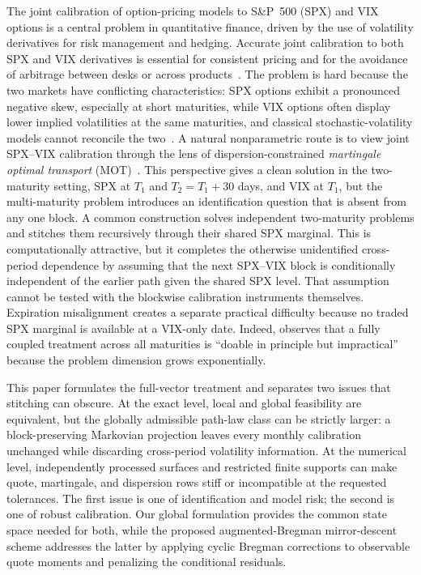 \documentclass{article}
\begin{document}
The joint calibration of option-pricing models to S\&P~500 (SPX) and VIX options is a central problem in quantitative finance, driven by the use of volatility derivatives for risk management and hedging.
Accurate joint calibration to both SPX and VIX derivatives is essential for consistent pricing and for the avoidance of arbitrage between desks or across products~\citep{guyon2020joint,cuchiero2025joint}.
The problem is hard because the two markets have conflicting characteristics:
SPX options exhibit a pronounced negative skew, especially at short maturities, while VIX options often display lower implied volatilities at the same maturities, and classical stochastic-volatility models cannot reconcile the two~\citep{carr2006tale,jacquier2018vix}.
A natural nonparametric route is to view joint SPX--VIX calibration through the lens of dispersion-constrained \emph{martingale optimal transport} (MOT)~\citep{Beiglbck2013,guyon2020joint}.
This perspective gives a clean solution in the two-maturity setting, SPX at $T_1$ and $T_2=T_1+30$ days, and VIX at $T_1$, but the multi-maturity problem introduces an identification question that is absent from any one block.
A common construction solves independent two-maturity problems and stitches them recursively through their shared SPX marginal.
This is computationally attractive, but it completes the otherwise unidentified cross-period dependence by assuming that the next SPX--VIX block is conditionally independent of the earlier path given the shared SPX level.
That assumption cannot be tested with the blockwise calibration instruments themselves.
Expiration misalignment creates a separate practical difficulty because no traded SPX marginal is available at a VIX-only date.
Indeed, \citet[Section~8]{guyon2020joint} observes that a fully coupled treatment across all maturities is ``doable in principle but impractical'' because the problem dimension grows exponentially.

This paper formulates the full-vector treatment and separates two issues that stitching can obscure.
At the exact level, local and global feasibility are equivalent, but the globally admissible path-law class can be strictly larger: a block-preserving Markovian projection leaves every monthly calibration unchanged while discarding cross-period volatility information.
At the numerical level, independently processed surfaces and restricted finite supports can make quote, martingale, and dispersion rows stiff or incompatible at the requested tolerances.
The first issue is one of identification and model risk; the second is one of robust calibration.
Our global formulation provides the common state space needed for both, while the proposed augmented-Bregman mirror-descent scheme addresses the latter by applying cyclic Bregman corrections to observable quote moments and penalizing the conditional residuals.
\end{document}
